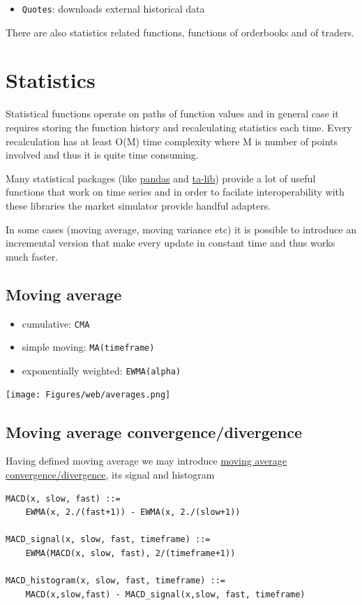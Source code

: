 \documentclass[a4paper,11pt]{article}
\begin{document}
\begin{itemize}
\itemsep1pt\parskip0pt
\item
  \texttt{Quotes}: downloads external historical data
\end{itemize}

There are also statistics related functions,
functions of orderbooks and of traders.

\section{Statistics}\label{statistics}

Statistical functions operate on paths of function values and in general
case it requires storing the function history and recalculating
statistics each time. Every recalculation has at least O(M) time
complexity where M is number of points involved and thus it is quite
time consuming.

Many statistical packages (like \href{http://pandas.pydata.org/}{pandas}
and \href{http://ta-lib.org/}{ta-lib}) provide a lot of useful functions
that work on time series and in order to facilate interoperability with
these libraries the market simulator provide handful adapters.

In some cases (moving average, moving variance etc) it is possible to
introduce an incremental version that make every update in constant time
and thus works much faster.

\subsection{Moving average}\label{moving-average}

\begin{itemize}
\itemsep1pt\parskip0pt
\item
  cumulative: \texttt{CMA}
\item
  simple moving: \texttt{MA(timeframe)}
\item
  exponentially weighted: \texttt{EWMA(alpha)}
\end{itemize}

\centerline{\texttt{[image: Figures/web/averages.png]}}

\subsection{Moving average
convergence/divergence}\label{moving-average-convergencedivergence}

Having defined moving average we may introduce
\href{http://en.wikipedia.org/wiki/MACD}{moving average
convergence/divergence}, its signal and histogram
\begin{verbatim}
MACD(x, slow, fast) ::= 
    EWMA(x, 2./(fast+1)) - EWMA(x, 2./(slow+1))

MACD_signal(x, slow, fast, timeframe) ::= 
    EWMA(MACD(x, slow, fast), 2/(timeframe+1))

MACD_histogram(x, slow, fast, timeframe) ::= 
    MACD(x,slow,fast) - MACD_signal(x,slow, fast, timeframe)
\end{verbatim}
\end{document}

